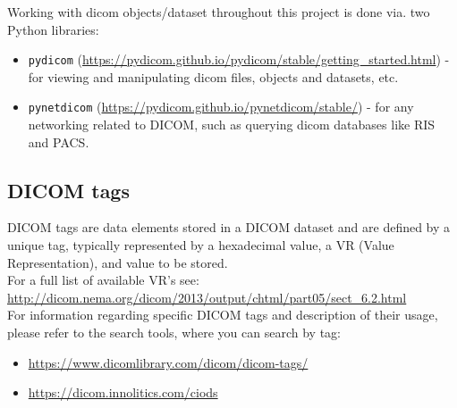 \documentclass{article}
\begin{document}
Working with dicom objects/dataset throughout this project is done via. two Python libraries:
\begin{itemize}
	\item \texttt{pydicom} (\url{https://pydicom.github.io/pydicom/stable/getting_started.html}) - for viewing and manipulating dicom files, objects and datasets, etc.
	\item \texttt{pynetdicom} (\url{https://pydicom.github.io/pynetdicom/stable/}) - for any networking related to DICOM, such as querying dicom databases like RIS and PACS.
\end{itemize}

\subsection{DICOM tags}
DICOM tags are data elements stored in a DICOM dataset and are defined by a unique tag, typically represented by a hexadecimal value, a VR (Value Representation), and value to be stored. \\

For a full list of available VR's see: \url{http://dicom.nema.org/dicom/2013/output/chtml/part05/sect_6.2.html} \\

For information regarding specific DICOM tags and description of their usage, please refer to the search tools, where you can search by tag:
\begin{itemize}
	\item \url{https://www.dicomlibrary.com/dicom/dicom-tags/}
	\item \url{https://dicom.innolitics.com/ciods}
\end{itemize}
\end{document}
